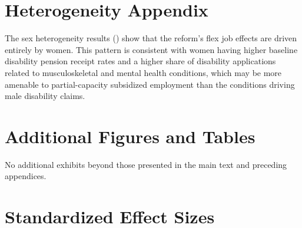 \documentclass[12pt]{article}
\begin{document}
\section{Heterogeneity Appendix}

The sex heterogeneity results () show that the reform's flex job effects are driven entirely by women. This pattern is consistent with women having higher baseline disability pension receipt rates and a higher share of disability applications related to musculoskeletal and mental health conditions, which may be more amenable to partial-capacity subsidized employment than the conditions driving male disability claims.


\section{Additional Figures and Tables}

No additional exhibits beyond those presented in the main text and preceding appendices.


\section{Standardized Effect Sizes}
\label{sec:sde}


\end{document}

